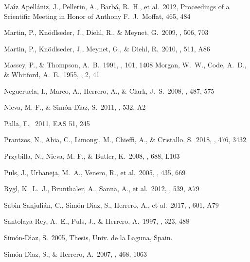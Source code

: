 \documentclass{aa} %
\begin{document}
\begin{thebibliography}{}
	 Ma{\'{\i}}z Apell{\'a}niz, J., Pellerin, A., Barb{\'a}, R.~H., et al.\ 2012, Proceedings of a Scientific Meeting in Honor of Anthony F.~J.~Moffat, 465, 484 
    
	 Martin, P., Kn{\"o}dlseder, J., Diehl, R., \& Meynet, G.\ 2009, \aap, 506, 703   

	  Martin, P., Kn{\"o}dlseder, J., Meynet, G., \& Diehl, R.\ 2010, \aap, 511, A86    
    
    
	  Massey, P., \& Thompson, A.~B.\ 1991, \aj, 101, 1408    
 	  Morgan, W.~W., Code, A.~D., \& Whitford, A.~E.\ 1955, \apjs, 2, 41 

	  Negueruela, I., Marco, A., Herrero, A., \& Clark, J.~S.\ 2008, \aap, 487, 575 
   
 	 Nieva, M.-F., \& Sim{\'o}n-D{\'{\i}}az, S.\ 2011, \aap, 532, A2  
       
     Palla, F. \ 2011, EAS 51, 245
	
	 Prantzos, N., Abia, C., Limongi, M., Chieffi, A., \& Cristallo, S.\ 2018, \mnras, 476, 3432
    
	 Przybilla, N., Nieva, M.-F., \& Butler, K.\ 2008, \apjl, 688, L103
	
	 Puls, J., Urbaneja, M.~A., Venero, R., et al.\ 2005, \aap, 435, 669 
	
    
	 Rygl, K.~L.~J., Brunthaler, A., Sanna, A., et al.\ 2012, \aap, 539, A79 
	
	 Sab{\'{\i}}n-Sanjuli{\'a}n, C., Sim{\'o}n-D{\'{\i}}az, S., Herrero, A., et al.\ 2017, \aap, 601, A79 
	
	 Santolaya-Rey, A.~E., Puls, J., \& Herrero, A.\ 1997, \aap, 323, 488
	
	  Sim{\'o}n-D{\'{\i}}az, S.\ 2005, Thesis, 	Univ. de la Laguna, Spain. 	
	
	  Sim{\'o}n-D{\'{\i}}az, S., \& Herrero, A.\ 2007, \aap, 468, 1063  
	   

\end{thebibliography}
\end{document}
